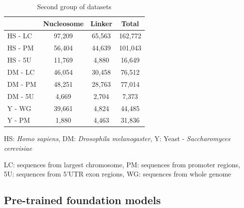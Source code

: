 \documentclass[a4paper,fleqn]{cas-dc}
\begin{document}
\begin{table}[width=\linewidth,cols=4,pos=h]
	\begin{threeparttable}
		\caption{Second group of datasets}
		\label{tbl2}
		\begin{tabular*}{\tblwidth}{@{} LCCC @{} }
			\toprule
			& Nucleosome & Linker & Total \\
			\midrule
			HS - LC & 97,209 & 65,563 & 162,772 \\
			HS - PM & 56,404 & 44,639 & 101,043 \\
			HS - 5U & 11,769 & 4,880 & 16,649 \\
			DM - LC & 46,054 & 30,458 & 76,512 \\
			DM - PM & 48,251 & 28,763 & 77,014 \\
			DM - 5U & 4,669 & 2,704 & 7,373 \\
			Y - WG & 39,661 & 4,824 & 44,485 \\		
			Y - PM & 1,880 & 4,463 & 31,836 \\
			\bottomrule
		\end{tabular*}
		\begin{tablenotes}
			\small
			\item HS: \textit{Homo sapiens}, DM: \textit{Drosophila melanogaster}, Y: Yeast - \textit{Saccharomyces cerevisiae} \\ 
			\item LC: sequences from largest chromosome, PM: sequences from promoter regions, 5U: sequences from 5'UTR exon regions, WG: sequences from whole genome 
		\end{tablenotes}
	\end{threeparttable}
\end{table}

\subsection{Pre-trained foundation models}
\end{document}
